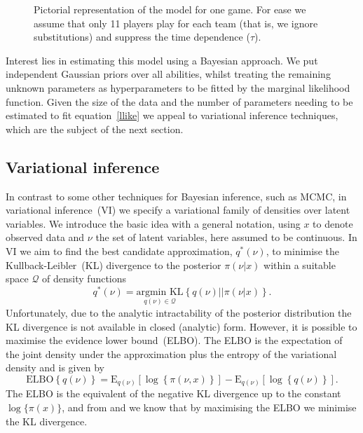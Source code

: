 \documentclass[11pt,a4paper]{article}
\newcommand{\expect}{\textrm{E}}
\newcommand{\elbo}{\textrm{ELBO}}
\begin{document}
\begin{figure}
\caption{Pictorial representation of the model for one game. For ease we assume that only 11 players play for each team (that is, we ignore substitutions) and suppress the time dependence ($\tau$).} \label{pic-model}
\end{figure} 


Interest lies in estimating this model using a Bayesian approach. We 
put independent Gaussian priors over all abilities, whilst treating 
the remaining unknown parameters as hyperparameters to be fitted 
by the marginal likelihood function. Given the size of the data and 
the number of parameters needing to be estimated to fit 
equation~\eqref{llike} we appeal to variational inference techniques, 
which are the subject of the next section.







    \subsection{Variational inference} \label{var-inf}


In contrast to some other techniques for Bayesian inference, such as 
MCMC, in variational inference~(VI) we specify a variational family of densities over 
latent variables. We introduce the basic idea with a general notation, using $x$ to denote observed data and $\nu$ the set of latent variables, here assumed to be continuous. In VI we aim to find the best candidate 
approximation, $q^*(\nu)$, to minimise the Kullback-Leibler~(KL) 
divergence to the posterior $\pi(\nu\vert x)$ within a suitable space $\mathcal Q$ of density functions
\[
q^*(\nu) = \underset{q\left(\nu\right) \in \mathcal Q}{\textrm{argmin KL}}\left\{q(\nu)\vert\vert\pi(\nu\vert x) \right\}.
\]
Unfortunately, due to the analytic intractability of the posterior 
distribution the KL divergence is not available in closed (analytic) 
form. However, it is possible to maximise the evidence lower bound~(ELBO). 
The ELBO is the expectation of the joint density under the 
approximation plus the entropy of the variational density and is 
given by
\begin{equation}\label{elbo}
\elbo\left\{q\left(\nu\right)\right\} = \expect_{q\left(\nu\right)}\left[\log\left\{\pi\left(\nu,x\right)\right\}\right] - \expect_{q\left(\nu\right)}\left[\log\left\{q\left(\nu\right)\right\}\right].
\end{equation}
The ELBO is the equivalent of the negative KL divergence up to the 
constant $\log\{\pi(x)\}$, and from \cite{jordan_1999} and 
\cite{bishop_2006} we know that by maximising the ELBO we minimise 
the KL divergence. 
\end{document}

